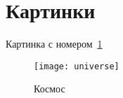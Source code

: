 \section{Картинки}

Картинка с номером~\ref{fig:uni}

\begin{figure}[H]
    \texttt{[image: universe]}
    \caption{Космос}\label{fig:uni}
\end{figure}
